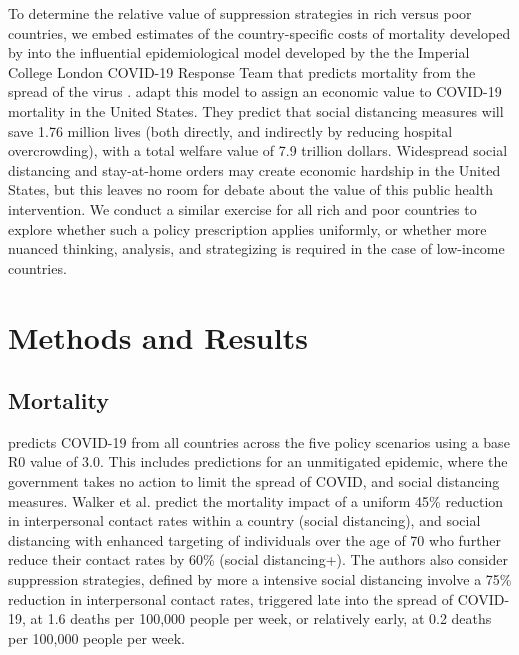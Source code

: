 \documentclass[11pt]{article}
\begin{document}
To determine the relative value of suppression strategies in rich versus poor countries, we embed estimates of the country-specific costs of mortality developed by \textcite{viscusi2017} into the influential epidemiological model developed by the the Imperial College London COVID-19 Response Team that predicts mortality from the spread of the virus \parencite{ferguson2020,walker2020}. \textcite{greenstone2020} adapt this model to assign an economic value to COVID-19 mortality in the United States. They predict that social distancing measures will save 1.76 million lives (both directly, and indirectly by reducing hospital overcrowding), with a total welfare value of 7.9 trillion dollars. Widespread social distancing and stay-at-home orders may create economic hardship in the United States, but this leaves no room for debate about the value of this public health intervention. We conduct a similar exercise for all rich and poor countries to explore whether such a policy prescription applies uniformly, or whether more nuanced thinking, analysis, and strategizing is required in the case of low-income countries.


\section{Methods and Results}

\subsection{Mortality}

\textcite{walker2020} predicts COVID-19 from all countries across the five policy scenarios using a base R0 value of 3.0. This includes predictions for an unmitigated epidemic, where the government takes no action to limit the spread of COVID, and social distancing measures. Walker et al. predict the mortality impact of a uniform 45\% reduction in interpersonal contact rates within a country (social distancing), and social distancing with enhanced targeting of individuals over the age of 70 who further reduce their contact rates by 60\% (social distancing+). The authors also consider suppression strategies, defined by more a intensive social distancing involve a 75\% reduction in interpersonal contact rates, triggered late into the spread of COVID-19, at 1.6 deaths per 100,000 people per week, or relatively early, at 0.2 deaths per 100,000 people per week.
 
\end{document}
